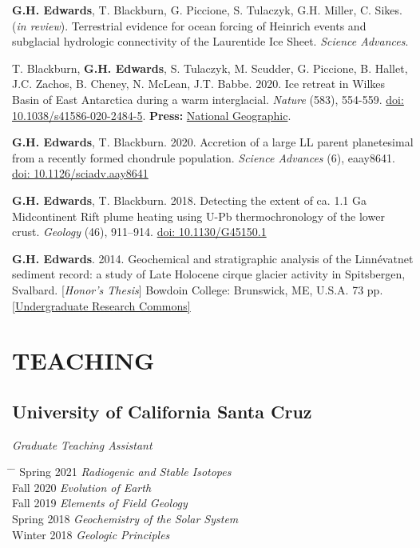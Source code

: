 \documentclass[10pt]{article}
\newcommand{\ghedwards}{\textbf{G.H. Edwards}}
\begin{document}
\begin{etaremune} [itemsep=4pt, leftmargin=3ex]
\item \ghedwards, T. Blackburn, G. Piccione, S. Tulaczyk, G.H. Miller, C. Sikes. (\textit{in review}). Terrestrial evidence for ocean forcing of Heinrich events and subglacial hydrologic connectivity of the Laurentide Ice Sheet. \textit{Science Advances}.
\item T. Blackburn, \ghedwards, S. Tulaczyk, M. Scudder, G. Piccione, B. Hallet, J.C. Zachos, B. Cheney, N. McLean, J.T. Babbe. 2020. Ice retreat in Wilkes Basin of East Antarctica during a warm interglacial. \textit{Nature} (583), 554-559. \href{https://doi.org/10.1038/s41586-020-2484-5}{doi: 10.1038/s41586-020-2484-5}. \textbf{Press:} \href{https://www.nationalgeographic.com/science/2020/07/east-antarctic-ice-sheet-more-vulnerable-to-melting-than-thought/}{National Geographic}.
\item \ghedwards, T. Blackburn. 2020. Accretion of a large LL parent planetesimal from a recently formed chondrule population. \textit{Science Advances} (6), eaay8641. \href{https://advances.sciencemag.org/content/6/16/eaay8641}{doi: 10.1126/sciadv.aay8641}
\item \ghedwards, T. Blackburn. 2018. Detecting the extent of ca. 1.1 Ga Midcontinent Rift plume heating using U-Pb thermochronology of the lower crust. \textit{Geology} (46), 911–914. \href{https://doi.org/10.1130/G45150.1}{doi: 10.1130/G45150.1} 
\item \ghedwards. 2014. Geochemical and stratigraphic analysis of the Linnévatnet sediment record: a study of Late Holocene cirque glacier activity in Spitsbergen, Svalbard. [\textit{Honor’s Thesis}] Bowdoin College: Brunswick, ME, U.S.A. 73 pp. \href{https://digitalcommons.bowdoin.edu/honorsprojects/12/}{[Undergraduate Research Commons]}
\end{etaremune}


\section*{TEACHING}

\subsection*{\textbf{University of California Santa Cruz}}
\textit{Graduate Teaching Assistant}
\begin{tabbing} \hspace{10pt} \= \hspace{2.5cm} \=  \kill
\> Spring 2021 \> \textit{Radiogenic and Stable Isotopes}\\
\> Fall 2020 \> \textit{Evolution of Earth}\\
\> Fall 2019 \> \textit{Elements of Field Geology}\\
\> Spring 2018 \>  \textit{Geochemistry of the Solar System}\\
\> Winter 2018 \> \textit{Geologic Principles}
\end{tabbing}
\end{document}
